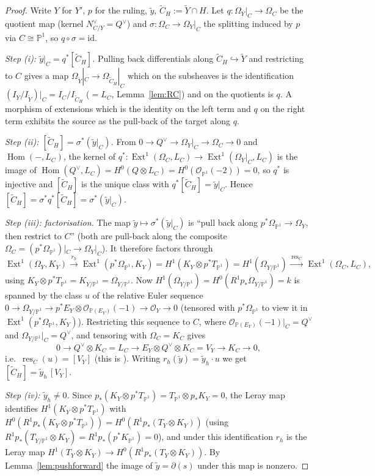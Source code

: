 \documentclass[11pt,reqno]{amsart}
\theoremstyle{plain}
\theoremstyle{definition}
\newcommand{\PP}{\mathbb{P}}
\newcommand{\OO}{\mathcal{O}}
\newcommand{\Hom}{\operatorname{Hom}}
\newcommand{\Ext}{\operatorname{Ext}}
\newcommand{\id}{\mathrm{id}}
\newcommand{\Yt}{\widetilde{Y}}
\newcommand{\Ct}{\widetilde{C}}
\newcommand{\yt}{\tilde{y}}
\begin{document}
\begin{proof}
Write $Y$ for $Y'$, $p$ for the ruling, $\yt$, $\Ct_H:=\Yt\cap H$. Let $q\colon\Omega_Y|_C\to\Omega_C$ be the quotient map (kernel $N_{C/Y}^{\vee}=Q^{\vee}$) and $\sigma\colon\Omega_C\to\Omega_Y|_C$ the splitting induced by $p$ via $C\cong\PP^1$, so $q\circ\sigma=\id$.

\emph{Step (i): $\yt|_C=q^*[\Ct_H]$.} Pulling back differentials along $\Ct_H\hookrightarrow\Yt$ and restricting to $C$ gives a map $\Omega_{\Yt}|_C\to\Omega_{\Ct_H}|_C$ which on the subsheaves is the identification $(I_Y/I_{\Yt})|_C=I_C/I_{\Ct_H}$ ($=L_C$, Lemma~\ref{lem:RC}) and on the quotients is $q$. A morphism of extensions which is the identity on the left term and $q$ on the right term exhibits the source as the pull-back of the target along $q$.

\emph{Step (ii): $[\Ct_H]=\sigma^*(\yt|_C)$.} From $0\to Q^{\vee}\to\Omega_Y|_C\to\Omega_C\to0$ and $\Hom(-,L_C)$, the kernel of $q^*\colon\Ext^1(\Omega_C,L_C)\to\Ext^1(\Omega_Y|_C,L_C)$ is the image of $\Hom(Q^{\vee},L_C)=H^0(Q\otimes L_C)=H^0(\OO_{\PP^1}(-2))=0$, so $q^*$ is injective and $[\Ct_H]$ is the unique class with $q^*[\Ct_H]=\yt|_C$. Hence $[\Ct_H]=\sigma^*q^*[\Ct_H]=\sigma^*(\yt|_C)$.

\emph{Step (iii): factorisation.} The map $\yt\mapsto\sigma^*(\yt|_C)$ is ``pull back along $p^*\Omega_{\PP^1}\to\Omega_Y$, then restrict to $C$'' (both are pull-back along the composite $\Omega_C=(p^*\Omega_{\PP^1})|_C\to\Omega_Y|_C$). It therefore factors through
\[
\Ext^1(\Omega_Y,K_Y)\xrightarrow{\ r_h\ }\Ext^1(p^*\Omega_{\PP^1},K_Y)=H^1(K_Y\otimes p^*T_{\PP^1})=H^1(\Omega_{Y/\PP^1})\xrightarrow{\ \operatorname{res}_C\ }\Ext^1(\Omega_C,L_C),
\]
using $K_Y\otimes p^*T_{\PP^1}=K_{Y/\PP^1}=\Omega_{Y/\PP^1}$. Now $H^1(\Omega_{Y/\PP^1})=H^0(R^1p_*\Omega_{Y/\PP^1})=k$ is spanned by the class $u$ of the relative Euler sequence $0\to\Omega_{Y/\PP^1}\to p^*E_Y\otimes\OO_{\PP(E_Y)}(-1)\to\OO_Y\to0$ (tensored with $p^*\Omega_{\PP^1}$ to view it in $\Ext^1(p^*\Omega_{\PP^1},K_Y)$). Restricting this sequence to $C$, where $\OO_{\PP(E_Y)}(-1)|_C=Q^{\vee}$ and $\Omega_{Y/\PP^1}|_C=Q^{\vee}$, and tensoring with $\Omega_C=K_C$ gives
\[
0\to Q^{\vee}\otimes K_C=L_C\to E_Y\otimes Q^{\vee}\otimes K_C=V_Y\to K_C\to0,
\]
i.e.\ $\operatorname{res}_C(u)=[V_Y]$ (this is \cite[Claim~7.6]{DM25}). Writing $r_h(\yt)=\yt_h\cdot u$ we get $[\Ct_H]=\yt_h\,[V_Y]$.

\emph{Step (iv): $\yt_h\ne0$.} Since $p_*(K_Y\otimes p^*T_{\PP^1})=T_{\PP^1}\otimes p_*K_Y=0$, the Leray map identifies $H^1(K_Y\otimes p^*T_{\PP^1})$ with $H^0(R^1p_*(K_Y\otimes p^*T_{\PP^1}))=H^0(R^1p_*(T_Y\otimes K_Y))$ (using $R^1p_*(T_{Y/\PP^1}\otimes K_Y)=R^1p_*(p^*K_{\PP^1})=0$), and under this identification $r_h$ is the Leray map $H^1(T_Y\otimes K_Y)\to H^0(R^1p_*(T_Y\otimes K_Y))$. By Lemma~\ref{lem:pushforward} the image of $\yt=\partial(s)$ under this map is nonzero.


\end{proof}
\end{document}
